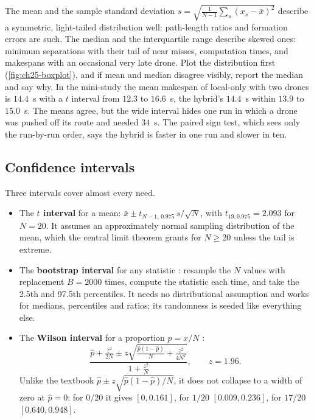 The mean and the sample standard deviation
$s = \sqrt{\frac{1}{N-1}\sum_s (x_s - \bar x)^2}$ describe a symmetric,
light-tailed distribution well: path-length ratios and formation errors are
such. The median and the interquartile range describe skewed ones: minimum
separations with their tail of near misses, computation times, and makespans
with an occasional very late drone. Plot the distribution first
(\cref{fig:ch25-boxplot}), and if mean and median disagree visibly, report
the median and say why. In the mini-study the mean makespan of local-only
with two drones is $14.4$~s with a $t$ interval from $12.3$ to $16.6$~s,
the hybrid's $14.4$~s within $13.9$ to $15.0$~s. The means agree, but the
wide interval hides one run in which a drone was pushed off its route and
needed $34$~s. The paired sign test, which sees only the run-by-run
order, says the hybrid is faster in one run and slower in ten.

\subsection{Confidence intervals}

Three intervals cover almost every need.
\begin{itemize}
  \item The \textbf{$t$ interval} for a mean: $\bar x \pm t_{N-1,\,0.975}\,
        s/\sqrt{N}$, with $t_{19,0.975} = 2.093$ for $N = 20$. It assumes
        an approximately normal sampling distribution of the mean, which
        the central limit theorem grants for $N \ge 20$ unless the tail is
        extreme.
  \item The \textbf{bootstrap interval} for any statistic
        \cite{efron1993bootstrap}: resample the $N$ values with replacement
        $B = 2000$ times, compute the statistic each time, and take the
        2.5th and 97.5th percentiles. It needs no distributional assumption
        and works for medians, percentiles and ratios; its randomness is
        seeded like everything else.
  \item The \textbf{Wilson interval} for a
        proportion $\hat p = x/N$ \cite{wilson1927probable}:
        \begin{equation}
          \frac{\hat p + \frac{z^2}{2N} \pm z\sqrt{\frac{\hat p(1-\hat p)}{N}
          + \frac{z^2}{4N^2}}}{1 + \frac{z^2}{N}}, \qquad z = 1.96.
          \label{eq:ch25-wilson}
        \end{equation}
        Unlike the textbook $\hat p \pm z\sqrt{\hat p(1-\hat p)/N}$, it does
        not collapse to a width of zero at $\hat p = 0$: for $0/20$ it gives
        $[0, 0.161]$, for $1/20$ $[0.009, 0.236]$, for $17/20$
        $[0.640, 0.948]$.
\end{itemize}


